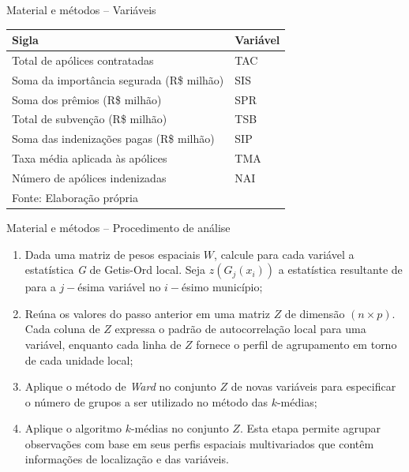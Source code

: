 \documentclass[aspectratio=169]{beamer}
\begin{document}
\begin{frame}{Material e métodos -- Variáveis}
    \begin{center}
    \small
        \begin{tabular}{ll}
            \hline 
            Sigla & Variável  \tabularnewline
            \hline 
            Total de apólices contratadas                  & TAC       \\ %
            Soma da importância segurada (R\$ milhão)      & SIS       \\ %
            Soma dos prêmios (R\$ milhão)                  & SPR       \\ %
            Total de subvenção (R\$ milhão)                & TSB       \\ %
            Soma das indenizações pagas (R\$ milhão)       & SIP       \\ %
            Taxa média aplicada às apólices                & TMA       \\ %
            Número de apólices indenizadas                 & NAI       \\ %
            \hline 
            \vspace{0.1cm}
            \footnotesize{Fonte: Elaboração própria}
            \end{tabular}
    \end{center}    
\end{frame}

\begin{frame}{Material e métodos -- Procedimento de análise}
    \begin{enumerate}
        \begin{enumerate}
            \item Dada uma matriz de pesos espaciais $W$, calcule para cada variável a estatística \textit{G} de Getis-Ord local. Seja $z(G_j(x_i))$ a estatística resultante de para a $j-$ésima variável no $i-$ésimo município; 
            \vspace{0.5cm}
            \item Reúna os valores do passo anterior em uma matriz $Z$ de dimensão $(n \times p)$. Cada coluna de $Z$ expressa o padrão de autocorrelação local para uma variável, enquanto cada linha de $Z$ fornece o perfil de agrupamento em torno de cada unidade local; 
            \vspace{0.5cm}
            \item Aplique o método de \textit{Ward} no conjunto $Z$ de novas variáveis para especificar o número de grupos a ser utilizado no método das $k$-médias;
	        \vspace{0.5cm}
	        \item Aplique o algoritmo $k$-médias no conjunto $Z$. Esta etapa permite agrupar observações com base em seus perfis espaciais multivariados que contêm informações de localização e das variáveis.
\end{enumerate}
    \end{enumerate}
\end{frame}
\end{document}
